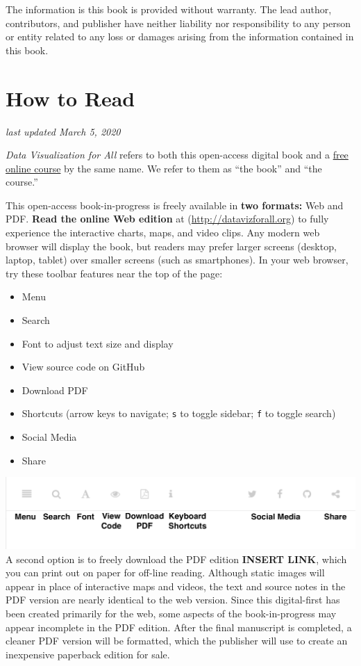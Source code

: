 \documentclass[
  english,
]{book}
\providecommand{\tightlist}{%
  \setlength{\itemsep}{0pt}\setlength{\parskip}{0pt}}
\begin{document}
The information is this book is provided without warranty. The lead author, contributors, and publisher have neither liability nor responsibility to any person or entity related to any loss or damages arising from the information contained in this book.

\hypertarget{read}{%
\section{How to Read}\label{read}}

\emph{last updated March 5, 2020}

\emph{Data Visualization for All} refers to both this open-access digital book and a \href{https://www.edx.org/course/data-visualization-for-all}{free online course} by the same name. We refer to them as ``the book'' and ``the course.''

This open-access book-in-progress is freely available in \textbf{two formats:} Web and PDF. \textbf{Read the online Web edition} at (\url{http://datavizforall.org}) to fully experience the interactive charts, maps, and video clips. Any modern web browser will display the book, but readers may prefer larger screens (desktop, laptop, tablet) over smaller screens (such as smartphones). In your web browser, try these toolbar features near the top of the page:

\begin{itemize}
\tightlist
\item
  Menu
\item
  Search
\item
  Font to adjust text size and display
\item
  View source code on GitHub
\item
  Download PDF
\item
  Shortcuts (arrow keys to navigate; \texttt{s} to toggle sidebar; \texttt{f} to toggle search)
\item
  Social Media
\item
  Share
\end{itemize}

\includegraphics{images/0-introduction/how-to-read.png}
A second option is to freely download the PDF edition \textbf{INSERT LINK}, which you can print out on paper for off-line reading. Although static images will appear in place of interactive maps and videos, the text and source notes in the PDF version are nearly identical to the web version. Since this digital-first has been created primarily for the web, some aspects of the book-in-progress may appear incomplete in the PDF edition. After the final manuscript is completed, a cleaner PDF version will be formatted, which the publisher will use to create an inexpensive paperback edition for sale.
\end{document}

